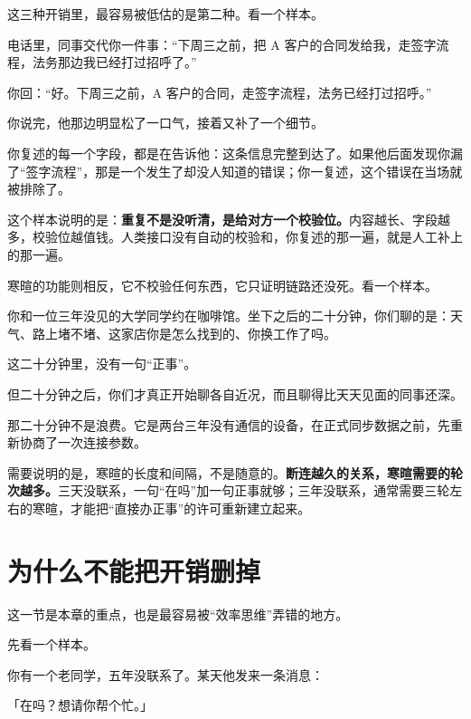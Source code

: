 这三种开销里，最容易被低估的是第二种。看一个样本。

\par
\begin{mdquote}
电话里，同事交代你一件事：“下周三之前，把 A 客户的合同发给我，走签字流程，法务那边我已经打过招呼了。”\par
你回：“好。下周三之前，A 客户的合同，走签字流程，法务已经打过招呼。”\par
你说完，他那边明显松了一口气，接着又补了一个细节。\par
你复述的每一个字段，都是在告诉他：这条信息完整到达了。如果他后面发现你漏了“签字流程”，那是一个发生了却没人知道的错误；你一复述，这个错误在当场就被排除了。
\end{mdquote}

这个样本说明的是：\textbf{重复不是没听清，是给对方一个校验位。}内容越长、字段越多，校验位越值钱。人类接口没有自动的校验和，你复述的那一遍，就是人工补上的那一遍。

寒暄的功能则相反，它不校验任何东西，它只证明链路还没死。看一个样本。

\par
\begin{mdquote}
你和一位三年没见的大学同学约在咖啡馆。坐下之后的二十分钟，你们聊的是：天气、路上堵不堵、这家店你是怎么找到的、你换工作了吗。\par
这二十分钟里，没有一句“正事”。\par
但二十分钟之后，你们才真正开始聊各自近况，而且聊得比天天见面的同事还深。\par
那二十分钟不是浪费。它是两台三年没有通信的设备，在正式同步数据之前，先重新协商了一次连接参数。
\end{mdquote}

需要说明的是，寒暄的长度和间隔，不是随意的。\textbf{断连越久的关系，寒暄需要的轮次越多。}三天没联系，一句“在吗”加一句正事就够；三年没联系，通常需要三轮左右的寒暄，才能把“直接办正事”的许可重新建立起来。

\section{为什么不能把开销删掉}

这一节是本章的重点，也是最容易被“效率思维”弄错的地方。

先看一个样本。

\par
\begin{mdquote}
你有一个老同学，五年没联系了。某天他发来一条消息：\par
\vspace{0.3\baselineskip}
「在吗？想请你帮个忙。」
\end{mdquote}

